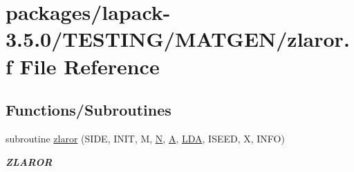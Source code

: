 \hypertarget{zlaror_8f}{}\section{packages/lapack-\/3.5.0/\+T\+E\+S\+T\+I\+N\+G/\+M\+A\+T\+G\+E\+N/zlaror.f File Reference}
\label{zlaror_8f}
\subsection*{Functions/\+Subroutines}
\begin{DoxyCompactItemize}
\item 
subroutine \hyperlink{group__complex16__matgen_ga447d8ff2c1016669865223cbb1ab5ca7}{zlaror} (S\+I\+D\+E, I\+N\+I\+T, M, \hyperlink{polmisc_8c_a0240ac851181b84ac374872dc5434ee4}{N}, \hyperlink{classA}{A}, \hyperlink{example__user_8c_ae946da542ce0db94dced19b2ecefd1aa}{L\+D\+A}, I\+S\+E\+E\+D, X, I\+N\+F\+O)
\begin{DoxyCompactList}\small\item\em {\bfseries Z\+L\+A\+R\+O\+R} \end{DoxyCompactList}\end{DoxyCompactItemize}
